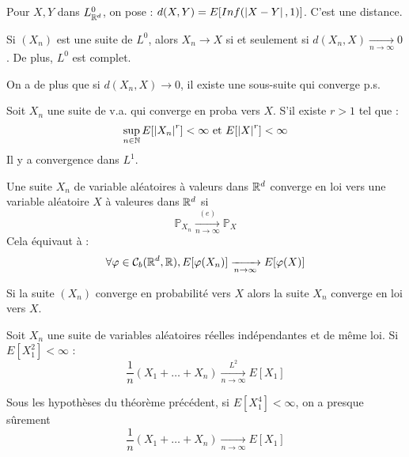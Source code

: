 \documentclass{cours}
\begin{document}
\begin{definition}
    Pour $X, Y$ dans $L_{\mathbb{R}^{d}}^{0}$, on pose : $d(X, Y) = E[Inf(\left|X - Y\right|, 1)]$. C'est une distance.
\end{definition}

\begin{proposition}
    Si $\left(X_{n}\right)$ est une suite de $L^{0}$, alors $X_{n} \rightarrow X$ si et seulement si $d(X_{n}, X) \xrightarrow[n \to \infty]{} 0$. De plus, $L^{0}$ est complet.
\end{proposition}


\begin{corollary}
    On a de plus que si $d(X_{n}, X) \rightarrow 0$, il existe une sous-suite qui converge p.s.
\end{corollary}

\begin{corollary}
    Soit $X_{n}$ une suite de v.a. qui converge en proba vers $X$. S'il existe $r > 1$ tel que :
    \[
        \sup_{n \in \mathbb{N}} E[\left|X_{n}\right|^{r}] < \infty \text{ et } E[\left|X\right|^{r}] < \infty
    \]
    Il y a convergence dans $L^{1}$.
\end{corollary}

\begin{definition}

    Une suite $X_{n}$ de variable aléatoires à valeurs dans $\mathbb{R}^{d}$ converge en loi vers une variable aléatoire $X$ à valeures dans $\mathbb{R}^{d}$ si
    \[
        \mathbb{P}_{X_{n}} \xrightarrow[n \to \infty]{(e)} \mathbb{P}_{X}
    \]
    Cela équivaut à :
    \[
        \forall \varphi \in \mathcal{C}_{b}(\mathbb{R}^{d}, \mathbb{R}), E[\varphi(X_{n})] \xrightarrow[n \to \infty]{} E[\varphi(X)]
    \]
\end{definition}

\begin{proposition}
    Si la suite $\left(X_{n}\right)$ converge en probabilité vers $X$ alors la suite $X_{n}$ converge en loi vers $X$.
\end{proposition}


\begin{theorem}
    Soit $X_{n}$ une suite de variables aléatoires réelles indépendantes et de même loi. Si $E[X_{1}^{2}] < \infty$ :
    \[
        \frac{1}{n}\left(X_{1} + \ldots + X_{n}\right) \xrightarrow[n \to \infty]{L^{2}} E[X_{1}]
    \]
\end{theorem}

\begin{proposition}
    Sous les hypothèses du théorème précédent, si $E\left[X_{1}^{4}\right] < \infty$, on a presque sûrement
    \[
        \frac{1}{n}\left(X_{1} + \ldots + X_{n}\right) \xrightarrow[n \to \infty]{} E[X_{1}]
    \]
\end{proposition}
\end{document}
